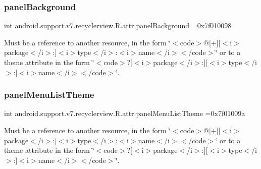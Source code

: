 \subsubsection{\texorpdfstring{panel\+Background}{panelBackground}}
{\footnotesize\ttfamily int android.\+support.\+v7.\+recyclerview.\+R.\+attr.\+panel\+Background =0x7f010098\hspace{0.3cm}{\ttfamily [static]}}

Must be a reference to another resource, in the form \char`\"{}$<$code$>$@\mbox{[}+\mbox{]}\mbox{[}$<$i$>$package$<$/i$>$\+:\mbox{]}$<$i$>$type$<$/i$>$\+:$<$i$>$name$<$/i$>$$<$/code$>$\char`\"{} or to a theme attribute in the form \char`\"{}$<$code$>$?\mbox{[}$<$i$>$package$<$/i$>$\+:\mbox{]}\mbox{[}$<$i$>$type$<$/i$>$\+:\mbox{]}$<$i$>$name$<$/i$>$$<$/code$>$\char`\"{}. \mbox{\label{classandroid_1_1support_1_1v7_1_1recyclerview_1_1R_1_1attr_ae18026cb484b3e5676e172ed20b58ce0}} 
\subsubsection{\texorpdfstring{panel\+Menu\+List\+Theme}{panelMenuListTheme}}
{\footnotesize\ttfamily int android.\+support.\+v7.\+recyclerview.\+R.\+attr.\+panel\+Menu\+List\+Theme =0x7f01009a\hspace{0.3cm}{\ttfamily [static]}}

Must be a reference to another resource, in the form \char`\"{}$<$code$>$@\mbox{[}+\mbox{]}\mbox{[}$<$i$>$package$<$/i$>$\+:\mbox{]}$<$i$>$type$<$/i$>$\+:$<$i$>$name$<$/i$>$$<$/code$>$\char`\"{} or to a theme attribute in the form \char`\"{}$<$code$>$?\mbox{[}$<$i$>$package$<$/i$>$\+:\mbox{]}\mbox{[}$<$i$>$type$<$/i$>$\+:\mbox{]}$<$i$>$name$<$/i$>$$<$/code$>$\char`\"{}. \mbox{\label{classandroid_1_1support_1_1v7_1_1recyclerview_1_1R_1_1attr_aab0ef3b4e13bf76b22288dd8334e2115}} 
